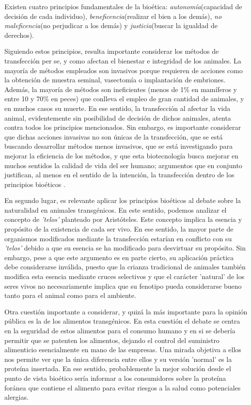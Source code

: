 \documentclass[fleqn,10pt]{SelfArx} %
\begin{document}
Existen cuatro principios fundamentales de la bioética: \textit{autonomía}(capacidad de decisión de cada individuo), \textit{beneficencia}(realizar el bien a los demás), \textit{no maleficencia}(no perjudicar a los demás) y \textit{justicia}(buscar la igualdad de derechos)\cite{Cooley, tsai2005bioethical}.

Siguiendo estos principios, resulta importante considerar los métodos de transfección per se, y como afectan el bienestar e integridad de los animales. La mayoría de métodos empleados son invasivos porque requieren de acciones como la obtención de muestra seminal, vasectomía o implantación de embriones. Además, la mayoría de métodos son ineficientes (menos de 1\% en mamíferos y entre 10 y 70\% en peces)  que conlleva el empleo de gran cantidad de animales, y en muchos casos su muerte. En ese sentido, la transfección al afectar la vida animal, evidentemente sin posibilidad de decisión de dichos animales, atenta contra todos los principios mencionados. Sin embargo, es importante considerar que dichas acciones invasivas no son únicas de la transfección, que se está buscando desarrollar métodos menos invasivos, que se está investigando para mejorar la eficiencia de los métodos, y que esta biotecnología busca mejorar en muchos sentidos la calidad de vida del ser humano; argumentos que en conjunto justifican, al menos en el sentido de la intención, la transfección dentro de los principios bioéticos \cite{mepham1998use,christiansen2000bioethics, lassen2006after, niemann2007transgenic, Ormandy}. 

En segundo lugar, es relevante aplicar los principios bioéticos al debate sobre la naturalidad en animales transgénicos. En este sentido, podemos analizar el concepto de \textit{'telos'} planteado por Aristóteles. Este concepto implica la esencia y propósito de la existencia de cada ser vivo. En ese sentido, la mayor parte de organismos modificados mediante la transfección estarían en conflicto con su \textit{'telos'} debido a que su esencia se ha modificado para desvirtuar su propósito\cite{Rollin1998}. Sin embargo, pese a que este argumento es en parte cierto, su aplicación práctica debe considerarse inválida, puesto que la crianza tradicional de animales también modifica esta esencia mediante cruces selectivos y que el carácter 'natural' de los seres vivos no necesariamente implica que su fenotipo pueda considerarse bueno tanto para el animal como para el ambiente\cite{Verhoog2003294, Ormandy}. 


Otra cuestión importante a considerar, y quizá la más importante para la opinión pública es la de los alimentos transgénicos. En esta cuestión el debate se centra en la seguridad de estos alimentos para el consumo humano y en si se debería permitir que se patenten los alimentos, dejando el control del suministro alimenticio esencialmente en mano de las empresas. Una mirada objetiva a ellos nos permite ver que la única diferencia entre ellos y su versión 'normal' es la proteína insertada. En ese sentido, probablemente la mejor solución desde el punto de vista bioético sería informar a los consumidores sobre la proteína foránea que contiene el alimento para evitar riesgos a la salud como potenciales alergias\cite{berkowitz1994transgenic, Jefferson, ledford2013transgenic}. 
\end{document}
